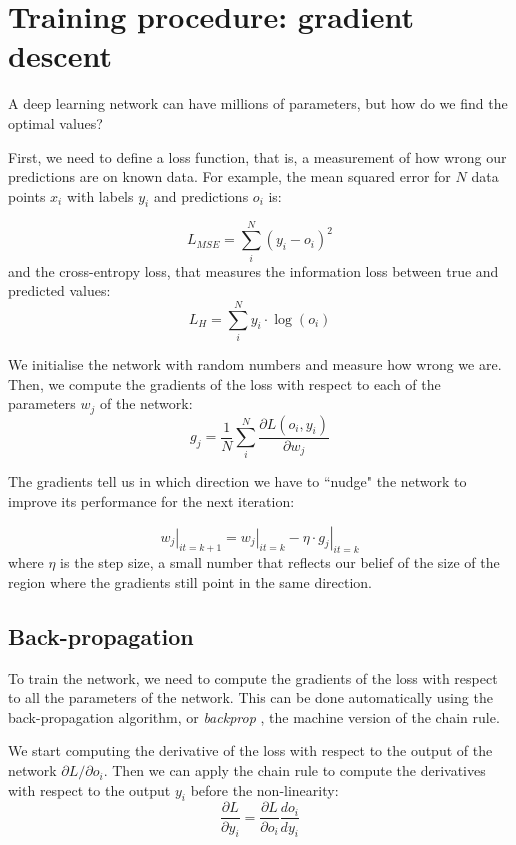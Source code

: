 \section[Gradient descent]{Training procedure: gradient descent}\label{sec:grad_descent}
A deep learning network can have millions of parameters, but how do we find the optimal values?

First, we need to define a loss function, that is, a measurement of how wrong our predictions are on known data.
For example, the mean squared error for $N$ data points  $x_i$ with labels $y_i$ and predictions $o_i$ is:

\begin{equation*}
L_{MSE} = \sum_i^N \left(y_i - o_i\right)^2
\end{equation*}
and the cross-entropy loss, that measures the information loss between true and predicted values:
\begin{equation*}
L_{H} = \sum_i^N y_i \cdot \log\left(o_i\right) 
\end{equation*}

We initialise the network with random numbers and measure how wrong we are.
Then, we compute the gradients of the loss with respect to each of the parameters $w_j$ of the network:
\begin{equation*}
g_j = \frac{1}{N}\sum_i^N\frac{\partial L\left(o_i, y_i \right)}{\partial w_j}
\end{equation*}

The gradients tell us in which direction we have to ``nudge" the network to improve its performance for the next iteration:

\begin{equation*}
\left. w_j\right|_{it=k+1} = \left. w_j\right|_{it=k} - \eta \cdot \left. g_j\right|_{it=k}
\end{equation*}
where $\eta$ is the step size, a small number that reflects our belief of the size of the region where the gradients still point in the same direction.

\subsection{Back-propagation}
To train the network, we need to compute the gradients of the loss with respect to all the parameters of the network.
This can be done automatically using the back-propagation algorithm, or \emph{backprop} \citep{backprop}, the machine version of the chain rule.

We start computing the derivative of the loss with respect to the output of the network ${\partial L}/{\partial o_i}$.
Then we can apply the chain rule to compute the derivatives with respect to the output $y_i$ before the non-linearity:
\begin{equation*}
\frac{\partial L}{\partial y_i} = \frac{\partial L}{\partial o_i} \frac{d o_i}{d y_i}
\end{equation*}

